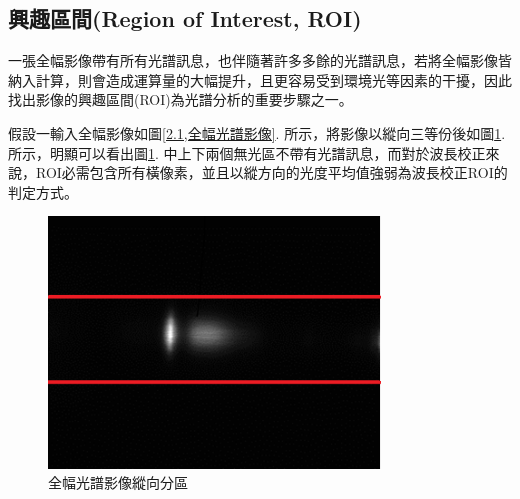 \subsection{興趣區間(Region of Interest, ROI)}
一張全幅影像帶有所有光譜訊息，也伴隨著許多多餘的光譜訊息，若將全幅影像皆納入計算，則會造成運算量的大幅提升，且更容易受到環境光等因素的干擾，因此找出影像的興趣區間(ROI)為光譜分析的重要步驟之一。\par
假設一輸入全幅影像如圖\ref{2.1,全幅光譜影像}. 所示，將影像以縱向三等份後如圖\ref{2.2,全幅光譜影像縱向分區}. 所示，明顯可以看出圖\ref{2.2,全幅光譜影像縱向分區}. 中上下兩個無光區不帶有光譜訊息，而對於波長校正來說，ROI必需包含所有橫像素，並且以縱方向的光度平均值強弱為波長校正ROI的判定方式。
\begin{figure}[H] %
	\centering %
	\setlength{\abovecaptionskip}{0.6cm}
	\includegraphics[width=8.8cm]{figures/p2-2.PNG} %
	\caption{全幅光譜影像縱向分區} %
	\label{2.2,全幅光譜影像縱向分區} %
\end{figure}
